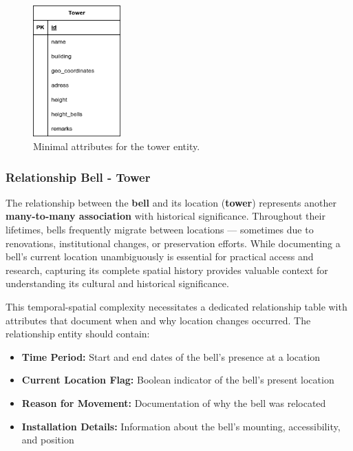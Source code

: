 \documentclass[11pt, a4paper]{article}
\begin{document}
\begin{figure}[h!]
    \centering
    \includegraphics[width=0.3\textwidth]{images/tower.png}
    \caption{Minimal attributes for the tower entity.}
    \label{fig:tower-entity}
\end{figure}

\subsubsection{Relationship Bell - Tower}

The relationship between the \textbf{bell} and its location (\textbf{tower}) represents another \textbf{many-to-many association} with historical significance. Throughout their lifetimes, bells frequently migrate between locations — sometimes due to renovations, institutional changes, or preservation efforts. While documenting a bell's current location unambiguously is essential for practical access and research, capturing its complete spatial history provides valuable context for understanding its cultural and historical significance.

This temporal-spatial complexity necessitates a dedicated relationship table with attributes that document when and why location changes occurred. The relationship entity should contain:

\begin{itemize}
    \item \textbf{Time Period:} Start and end dates of the bell's presence at a location
    \item \textbf{Current Location Flag:} Boolean indicator of the bell's present location
    \item \textbf{Reason for Movement:} Documentation of why the bell was relocated
    \item \textbf{Installation Details:} Information about the bell's mounting, accessibility, and position
\end{itemize}
\end{document}
